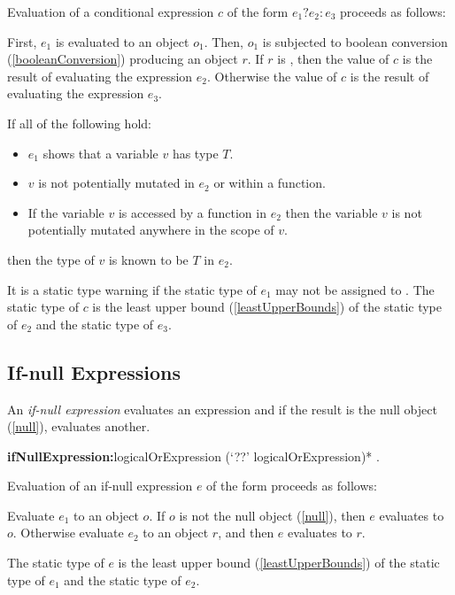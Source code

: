 \documentclass{article}
\begin{document}
\LMHash{}
Evaluation of a conditional expression $c$ of the form $e_1 ? e_2 : e_3$ proceeds as follows:

\LMHash{}
First, $e_1$ is evaluated to an object $o_1$.
Then, $o_1$ is subjected to boolean conversion (\ref{booleanConversion}) producing an object $r$.
If $r$ is \TRUE, then the value of $c$ is the result of evaluating the expression $e_2$.
Otherwise the value of $c$ is the result of evaluating the expression $e_3$.

\LMHash{}
If all of the following hold:
\begin{itemize}
\item $e_1$ shows that a variable $v$ has type $T$.
\item $v$ is not potentially mutated in $e_2$ or within a function.
\item If the variable $v$ is accessed by a function in $e_2$ then the variable $v$ is not potentially mutated anywhere in the scope of $v$.
\end{itemize}

then the type of $v$ is known to be $T$ in $e_2$.

\LMHash{}
It is a static type warning if the static type of $e_1$ may not be assigned to .
The static type of $c$ is the least upper bound (\ref{leastUpperBounds}) of the static type of $e_2$ and the static type of $e_3$.


\subsection{If-null Expressions}

\LMHash{}
An {\em if-null expression} evaluates an expression and if the result is the null object (\ref{null}), evaluates another.

\begin{grammar}
{\bf ifNullExpression:}logicalOrExpression (`??' logicalOrExpression)*
  .
\end{grammar}

\LMHash{}
Evaluation of an if-null expression $e$ of the form 
proceeds as follows:

\LMHash{}
Evaluate $e_1$ to an object $o$.
If $o$ is not the null object (\ref{null}), then $e$ evaluates to $o$.
Otherwise evaluate $e_2$ to an object $r$,
and then $e$ evaluates to $r$.

\LMHash{}
The static type of $e$ is the least upper bound (\ref{leastUpperBounds}) of the static type of $e_1$ and the static type of $e_2$.
\end{document}
